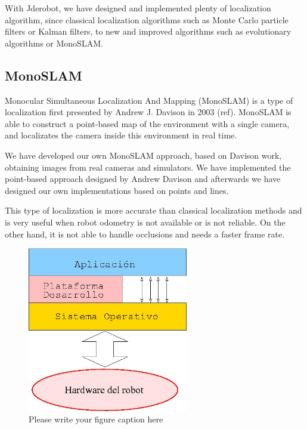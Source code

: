 \documentclass[twocolumn]{svjour3}          %
\begin{document}
With Jderobot, we have designed and implemented plenty of localization algorithm, since classical localization algorithms such as Monte Carlo particle filters or Kalman filters, to new and improved algorithms such as evolutionary algorithms or MonoSLAM.

\subsection{MonoSLAM}

Monocular Simultaneous Localization And Mapping (MonoSLAM) is a type of localization first presented by Andrew J. Davison in 2003 (ref). MonoSLAM is able to construct a point-based map of the environment with a single camera, and localizates the camera inside this environment in real time.

We have developed our own MonoSLAM approach, based on Davison work, obtaining images from real cameras and simulators. We have implemented the point-based approach designed by Andrew Davison and afterwards we have designed our own implementations based on points and lines.

This type of localization is more accurate than classical localization methods and is very useful when robot odometry is not available or is not reliable. On the other hand, it is not able to handle occlusions and needs a faster frame rate.

\begin{figure}
  \includegraphics[width=7cm]{figs/programacion3.jpg}
\caption{Please write your figure caption here}
\label{fig:2}       %
\end{figure}
\end{document}
